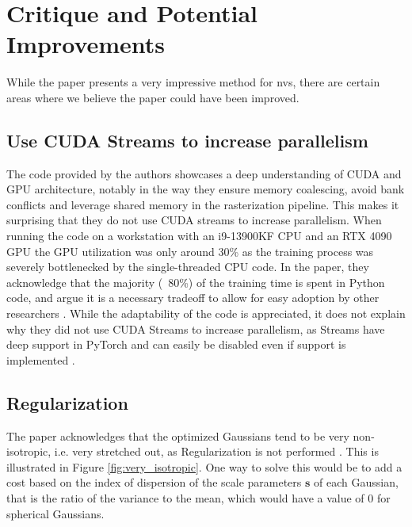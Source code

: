 \section{Critique and Potential Improvements}
While the paper presents a very impressive method for \gls{nvs}, there are certain areas where we believe the paper could have been improved.




\subsection{Use CUDA Streams to increase parallelism}
The code provided by the authors showcases a deep understanding of CUDA and GPU architecture,
notably in the way they ensure memory coalescing, avoid bank conflicts and leverage shared memory in the rasterization pipeline.
This makes it surprising that they do not use CUDA streams to increase parallelism.
When running the code on a workstation with an i9-13900KF CPU and an RTX 4090 GPU the GPU utilization was only around 30\% as the training process was severely bottlenecked by the single-threaded CPU code.
In the paper, they acknowledge that the majority (~80\%) of the training time is spent in Python code, and argue it is a necessary tradeoff to allow for easy adoption by other researchers \cite[Sec. 8]{kerbl3DGaussianSplatting2023}.
While the adaptability of the code is appreciated, it does not explain why they did not use CUDA Streams to increase parallelism, as Streams have deep support in PyTorch and can easily be disabled even if support is implemented \cite{pytorchcontributorsCUDASemanticsPyTorch2023}.

\subsection{Regularization}
The paper acknowledges that the optimized Gaussians tend to be very non-isotropic, i.e. very stretched out, as  Regularization is not performed \cite[Sec. 7.4]{kerbl3DGaussianSplatting2023}.
This is illustrated in Figure \ref{fig:very_isotropic}.
One way to solve this would be to add a cost based on the index of dispersion of the scale parameters $\bm{s}$ of each Gaussian, that is the ratio of the variance to the mean, which would have a value of 0 for spherical Gaussians.

